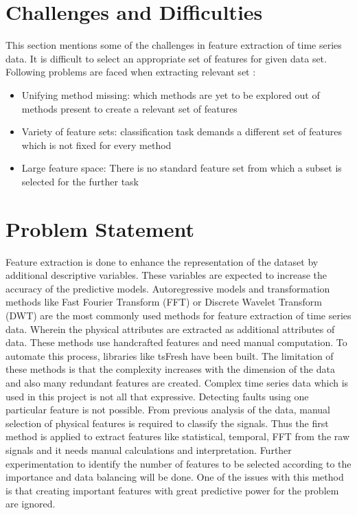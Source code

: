     \section{Challenges and Difficulties}
This section mentions some of the challenges in feature extraction of time series data. It is difficult to select an appropriate set of features for given data set. Following problems are faced when extracting relevant set \cite{herff2019extracting}:
\begin{itemize}
	\item Unifying method missing: which methods are yet to be explored out of methods present to create a relevant set of features
	\item Variety of feature sets: classification task demands a different set of features which is not fixed for every method
	\item Large feature space: There is no standard feature set from which a subset is selected for the further task

\end{itemize}


    \section{Problem Statement}
    Feature extraction is done to enhance the representation of the dataset by additional descriptive variables. These variables are expected to increase the accuracy of the predictive models. Autoregressive models and transformation methods like Fast Fourier Transform (FFT) \cite{murugappan2013human} or Discrete Wavelet Transform (DWT) \cite{saravanan2010incipient} are the most commonly used methods for feature extraction of time series data. Wherein the physical attributes are extracted as additional attributes of data. These methods use handcrafted features and need manual computation. To automate this process, libraries like tsFresh \cite{christ2018time} have been built. The limitation of these methods is that the complexity increases with the dimension of the data and also many redundant features are created. Complex time series data which is used in this project is not all that expressive.  Detecting faults using one particular feature is not possible. From previous analysis of the data, manual selection of physical features is required to classify the signals. Thus the first method is applied to extract features like statistical, temporal, FFT from the raw signals and it needs manual calculations and interpretation. Further experimentation to identify the number of features to be selected according to the importance and data balancing will be done. One of the issues with this method is that creating important features with great predictive power for the problem are ignored. 
    
